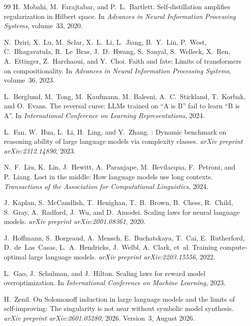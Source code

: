 \documentclass[11pt,a4paper]{article}
\begin{document}
\begin{thebibliography}{99}
H.~Mobahi, M.~Farajtabar, and P.~L.~Bartlett.
\newblock Self-distillation amplifies regularization in {Hilbert} space.
\newblock In \emph{Advances in Neural Information Processing Systems}, volume~33, 2020.

N.~Dziri, X.~Lu, M.~Sclar, X.~L.~Li, L.~Jiang, B.~Y.~Lin, P.~West, C.~Bhagavatula, R.~Le~Bras, J.~D.~Hwang, S.~Sanyal, S.~Welleck, X.~Ren, A.~Ettinger, Z.~Harchaoui, and Y.~Choi.
\newblock Faith and fate: Limits of transformers on compositionality.
\newblock In \emph{Advances in Neural Information Processing Systems}, volume~36, 2023.

L.~Berglund, M.~Tong, M.~Kaufmann, M.~Balesni, A.~C.~Stickland, T.~Korbak, and O.~Evans.
\newblock The reversal curse: {LLMs} trained on ``{A} is {B}'' fail to learn ``{B} is {A}''.
\newblock In \emph{International Conference on Learning Representations}, 2024.

L.~Fan, W.~Hua, L.~Li, H.~Ling, and Y.~Zhang.
: Dynamic benchmark on reasoning ability of large language models via complexity classes.
\newblock \emph{arXiv preprint arXiv:2312.14890}, 2023.

N.~F.~Liu, K.~Lin, J.~Hewitt, A.~Paranjape, M.~Bevilacqua, F.~Petroni, and P.~Liang.
\newblock Lost in the middle: How language models use long contexts.
\newblock \emph{Transactions of the Association for Computational Linguistics}, 2024.

J.~Kaplan, S.~McCandlish, T.~Henighan, T.~B.~Brown, B.~Chess, R.~Child, S.~Gray, A.~Radford, J.~Wu, and D.~Amodei.
\newblock Scaling laws for neural language models.
\newblock \emph{arXiv preprint arXiv:2001.08361}, 2020.

J.~Hoffmann, S.~Borgeaud, A.~Mensch, E.~Buchatskaya, T.~Cai, E.~Rutherford, D.~de~Las~Casas, L.~A.~Hendricks, J.~Welbl, A.~Clark, et~al.
\newblock Training compute-optimal large language models.
\newblock \emph{arXiv preprint arXiv:2203.15556}, 2022.

L.~Gao, J.~Schulman, and J.~Hilton.
\newblock Scaling laws for reward model overoptimization.
\newblock In \emph{International Conference on Machine Learning}, 2023.

H.~Zenil.
\newblock On {S}olomonoff induction in large language models and the limits of self-improving: The singularity is not near without symbolic model synthesis.
\newblock \emph{arXiv preprint arXiv:2601.05280}, 2026. Version~3, August 2026.


\end{thebibliography}
\end{document}
